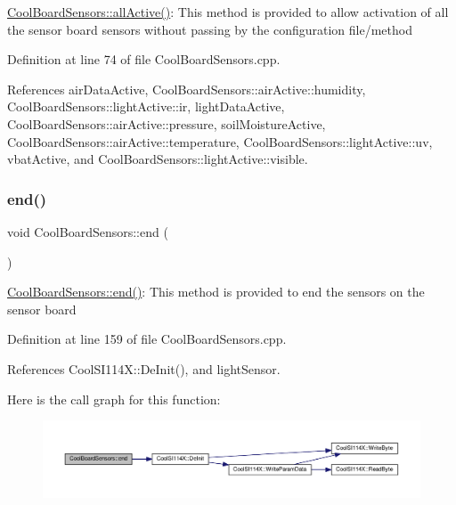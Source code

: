 \hyperlink{class_cool_board_sensors_aa432c5aac88f89c31a10766390f23e0b}{Cool\+Board\+Sensors\+::all\+Active()}\+: This method is provided to allow activation of all the sensor board sensors without passing by the configuration file/method 

Definition at line 74 of file Cool\+Board\+Sensors.\+cpp.



References air\+Data\+Active, Cool\+Board\+Sensors\+::air\+Active\+::humidity, Cool\+Board\+Sensors\+::light\+Active\+::ir, light\+Data\+Active, Cool\+Board\+Sensors\+::air\+Active\+::pressure, soil\+Moisture\+Active, Cool\+Board\+Sensors\+::air\+Active\+::temperature, Cool\+Board\+Sensors\+::light\+Active\+::uv, vbat\+Active, and Cool\+Board\+Sensors\+::light\+Active\+::visible.

\mbox{\label{class_cool_board_sensors_a4902b69f6e628bd6557193758fdd2bae}} 
\subsubsection{\texorpdfstring{end()}{end()}}
{\footnotesize\ttfamily void Cool\+Board\+Sensors\+::end (\begin{DoxyParamCaption}{ }\end{DoxyParamCaption})}

\hyperlink{class_cool_board_sensors_a4902b69f6e628bd6557193758fdd2bae}{Cool\+Board\+Sensors\+::end()}\+: This method is provided to end the sensors on the sensor board 

Definition at line 159 of file Cool\+Board\+Sensors.\+cpp.



References Cool\+S\+I114\+X\+::\+De\+Init(), and light\+Sensor.

Here is the call graph for this function\+:
\nopagebreak
\begin{figure}[H]
\begin{center}
\leavevmode
\includegraphics[width=350pt]{de/d46/class_cool_board_sensors_a4902b69f6e628bd6557193758fdd2bae_cgraph}
\end{center}
\end{figure}
\mbox{\label{class_cool_board_sensors_a9a218895c5423375c33c08f2c56fb23a}} 

